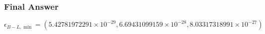 \subsubsection*{Final Answer}

\[
\boxed{
\epsilon_{B-L,\min}
=\left(
5.42781972291\times10^{-29},
6.69431099159\times10^{-28},
8.03317318991\times10^{-27}
\right)
}
\]
